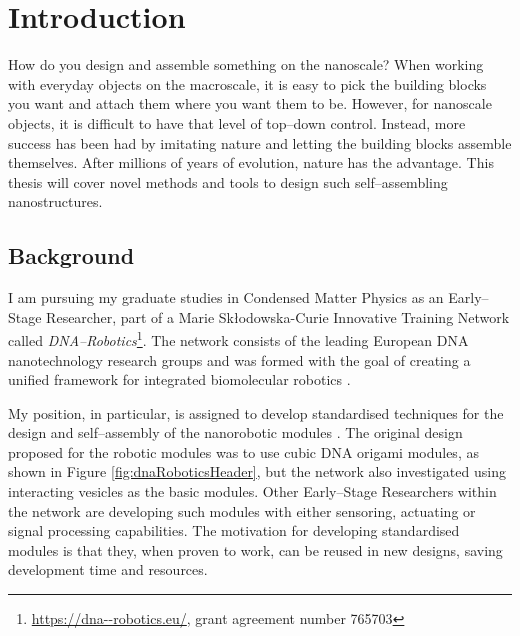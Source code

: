 
\chapter{Introduction}\label{ch:1-intro}

\minitoc

How do you design and assemble something on the nanoscale? When working with everyday objects on the macroscale, it is easy to pick the building blocks you want and attach them where you want them to be. However, for nanoscale objects, it is difficult to have that level of top--down control. Instead, more success has been had by imitating nature and letting the building blocks assemble themselves. After millions of years of evolution, nature has the advantage. This thesis will cover novel methods and tools to design such self--assembling nanostructures.

\section{Background}
I am pursuing my graduate studies in Condensed Matter Physics as an Early--Stage Researcher, part of a Marie Skłodowska-Curie Innovative Training Network called \emph{DNA--Robotics}\footnote{\url{https://dna--robotics.eu/}, grant agreement number 765703}. The network consists of the leading European DNA nanotechnology research groups and was formed with the goal of creating a unified framework for integrated biomolecular robotics \cite{dnaroboticsResearch}.

My position, in particular, is assigned to develop standardised techniques for the design and self--assembly of the nanorobotic modules \cite{dnaroboticsESR12}. The original design proposed for the robotic modules was to use cubic DNA origami modules, as shown in Figure \ref{fig:dnaRoboticsHeader}, but the network also investigated using interacting vesicles as the basic modules. Other Early--Stage Researchers within the network are developing such modules with either sensoring, actuating or signal processing capabilities. The motivation for developing standardised modules is that they, when proven to work, can be reused in new designs, saving development time and resources.

